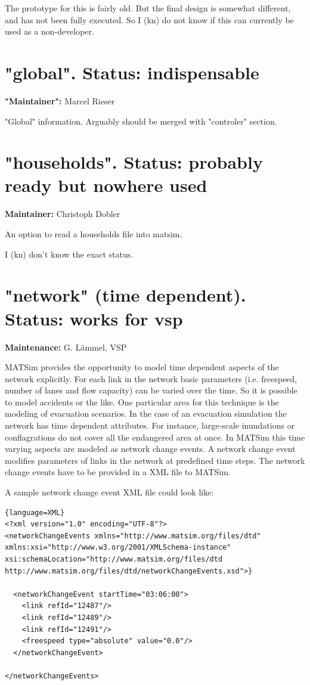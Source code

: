 The prototype for this is fairly old. But the final design is  somewhat different, and has not been fully executed. So I (kn) do  not know if this can currently be used as a non-developer.

\vfill\eject
\section{"global". Status: indispensable}

\textbf{"Maintainer":} Marcel Rieser

"Global" information. Arguably should be merged with "controler" section.

\vfill\eject
\section{"households". Status: probably ready but nowhere used}

\textbf{Maintainer:} Christoph Dobler

An option to read a households file into matsim.

I (kn) don't know the exact status.

\vfill\eject
\section{"network" (time dependent). Status: works for vsp}

\textbf{Maintenance:} G. Lämmel, VSP

MATSim provides the opportunity to model time dependent aspects of  the network explicitly. For each link in the network basic parameters  (i.e. freespeed, number of lanes and flow capacity) can be varied over  the time. So it is possible to model accidents or the like. One  particular area for this technique is the modeling of evacuation  scenarios.
In the case of an evacuation simulation the network has time dependent  attributes. For instance, large-scale inundations or conflagrations do  not cover all the endangered area at once.
In MATSim this time varying aspects are modeled as network change  events. A network change event modifies parameters of links in the  network at predefined time steps. The network change events have to be  provided in a XML file to MATSim.

A sample network change event XML file could look like:

\begin{lstlisting}{language=XML}
<?xml version="1.0" encoding="UTF-8"?>
<networkChangeEvents xmlns="http://www.matsim.org/files/dtd"  xmlns:xsi="http://www.w3.org/2001/XMLSchema-instance"  xsi:schemaLocation="http://www.matsim.org/files/dtd  http://www.matsim.org/files/dtd/networkChangeEvents.xsd">}

  <networkChangeEvent startTime="03:06:00">
    <link refId="12487"/>
    <link refId="12489"/>
    <link refId="12491"/>
    <freespeed type="absolute" value="0.0"/>
  </networkChangeEvent>

</networkChangeEvents>
\end{lstlisting}

